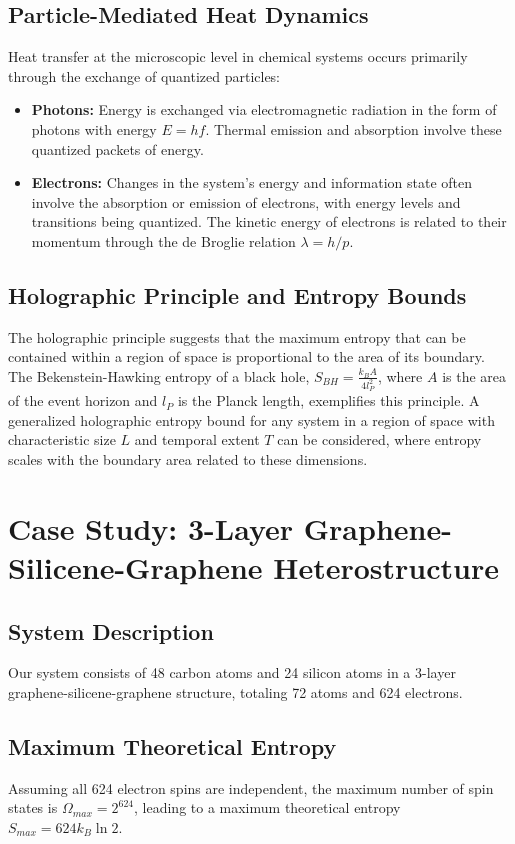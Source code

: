 	\subsection{Particle-Mediated Heat Dynamics}
	Heat transfer at the microscopic level in chemical systems occurs primarily through the exchange of quantized particles:
	\begin{itemize}
		\item \textbf{Photons:} Energy is exchanged via electromagnetic radiation in the form of photons with energy $E = h f$. Thermal emission and absorption involve these quantized packets of energy.
		\item \textbf{Electrons:} Changes in the system's energy and information state often involve the absorption or emission of electrons, with energy levels and transitions being quantized. The kinetic energy of electrons is related to their momentum through the de Broglie relation $\lambda = h/p$.
		\end{itemize}
		
		\subsection{Holographic Principle and Entropy Bounds}
		The holographic principle suggests that the maximum entropy that can be contained within a region of space is proportional to the area of its boundary. The Bekenstein-Hawking entropy of a black hole, $S_{BH} = \frac{k_B A}{4 l_P^2}$, where $A$ is the area of the event horizon and $l_P$ is the Planck length, exemplifies this principle. A generalized holographic entropy bound for any system in a region of space with characteristic size $L$ and temporal extent $T$ can be considered, where entropy scales with the boundary area related to these dimensions.
		
		\section{Case Study: 3-Layer Graphene-Silicene-Graphene Heterostructure}
		
		\subsection{System Description}
		Our system consists of 48 carbon atoms and 24 silicon atoms in a 3-layer graphene-silicene-graphene structure, totaling 72 atoms and 624 electrons.
		
		\subsection{Maximum Theoretical Entropy}
		Assuming all 624 electron spins are independent, the maximum number of spin states is $\Omega_{max} = 2^{624}$, leading to a maximum theoretical entropy $S_{max} = 624 k_B \ln 2$.
		
